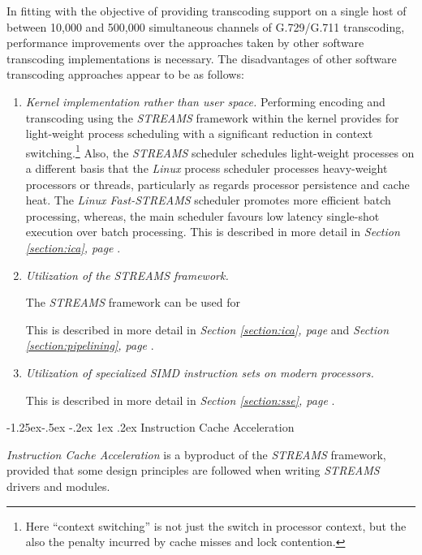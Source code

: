 \documentclass[letterpaper,final,notitlepage,twocolumn,10pt,twoside]{article}
\makeatletter
\let\normalsize = \small
\let\small = \footnotesize
\let\footnotesize = \scriptsize
\let\scriptsize = \tiny
\renewcommand\subsubsection{\@startsection{subsubsection}{3}{\z@}%
                                     {-1.25ex\@plus -.5ex \@minus -.2ex}%
                                     {1ex \@plus .2ex}%
                                     {\normalfont\normalsize\bfseries}}
\makeatother
\begin{document}
In fitting with the objective of providing transcoding support on a single host
of between 10,000 and 500,000 simultaneous channels of G.729/G.711 transcoding,
performance improvements over the approaches taken by other software transcoding
implementations is necessary.  The disadvantages of other software transcoding
approaches appear to be as follows:

\begin{enumerate}

\item{\it Kernel implementation rather than user space.} Performing encoding and
transcoding using the {\sl STREAMS} framework within the kernel provides for
light-weight process scheduling with a significant reduction in context
switching.\footnote{Here ``context switching'' is not just the switch in
processor context, but the also the penalty incurred by cache misses and lock
contention.}  Also, the {\sl STREAMS} scheduler schedules light-weight processes
on a different basis that the {\sl Linux} process scheduler processes
heavy-weight processors or threads, particularly as regards processor
persistence and cache heat.  The {\sl Linux Fast-STREAMS} scheduler promotes
more efficient batch processing, whereas, the main scheduler favours low latency
single-shot execution over batch processing.  This is described in more detail
in {\sl Section \ref{section:ica}, page \pageref{section:ica}}.

\item{\it Utilization of the {\sl STREAMS} framework.}

The {\sl STREAMS} framework can be used for 

This is described in more detail in {\sl Section \ref{section:ica}, page
\pageref{section:ica}} and {\sl Section \ref{section:pipelining}, page
\pageref{section:pipelining}}.

\item{\it Utilization of specialized SIMD instruction sets on modern
processors.}

This is described in more detail in {\sl Section \ref{section:sse}, page
\pageref{section:sse}}.

\end{enumerate}

\subsubsection{Instruction Cache Acceleration} \label{section:ica}

{\it Instruction Cache Acceleration} is a byproduct of the {\sl STREAMS}
framework, provided that some design principles are followed when writing {\sl
STREAMS} drivers and modules.
\end{document}

